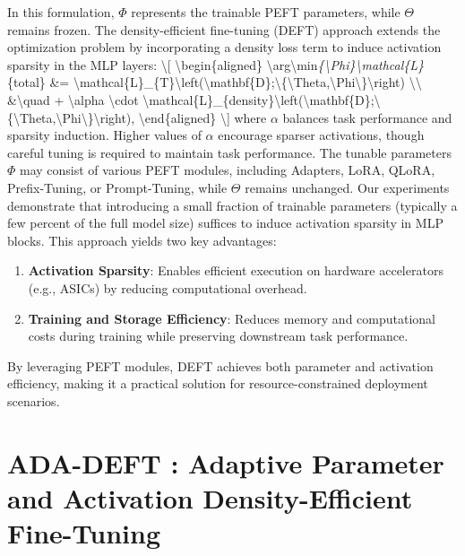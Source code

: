 \documentclass[11pt,a4paper]{article}
\begin{document}
In this formulation, \(\Phi\) represents the trainable PEFT parameters, while \(\Theta\) remains frozen. The density-efficient fine-tuning (DEFT) approach extends the optimization problem by incorporating a density loss term to induce activation sparsity in the MLP layers: \textbackslash{}[ \textbackslash{}begin\{aligned\} \textbackslash{}arg\textbackslash{}min\textit{\{\textbackslash{}Phi\}\textbackslash{}mathcal\{L\}}\{total\} \&= \textbackslash{}mathcal\{L\}\_\{T\}\textbackslash{}left(\textbackslash{}mathbf\{D\};\textbackslash{}\{\textbackslash{}Theta,\textbackslash{}Phi\textbackslash{}\}\textbackslash{}right) \textbackslash{}\textbackslash{} \&\textbackslash{}quad + \textbackslash{}alpha \textbackslash{}cdot \textbackslash{}mathcal\{L\}\_\{density\}\textbackslash{}left(\textbackslash{}mathbf\{D\};\textbackslash{}\{\textbackslash{}Theta,\textbackslash{}Phi\textbackslash{}\}\textbackslash{}right), \textbackslash{}end\{aligned\} \textbackslash{}] where \(\alpha\) balances task performance and sparsity induction. Higher values of \(\alpha\) encourage sparser activations, though careful tuning is required to maintain task performance. The tunable parameters \(\Phi\) may consist of various PEFT modules, including Adapters, LoRA, QLoRA, Prefix-Tuning, or Prompt-Tuning, while \(\Theta\) remains unchanged. Our experiments demonstrate that introducing a small fraction of trainable parameters (typically a few percent of the full model size) suffices to induce activation sparsity in MLP blocks. This approach yields two key advantages:
\begin{enumerate}
  \item \textbf{Activation Sparsity}: Enables efficient execution on hardware accelerators (e.g., ASICs) by reducing computational overhead.
  \item \textbf{Training and Storage Efficiency}: Reduces memory and computational costs during training while preserving downstream task performance.
\end{enumerate}
By leveraging PEFT modules, DEFT achieves both parameter and activation efficiency, making it a practical solution for resource-constrained deployment scenarios.




\section{ADA-DEFT : Adaptive Parameter and Activation Density-Efficient Fine-Tuning}
\end{document}
